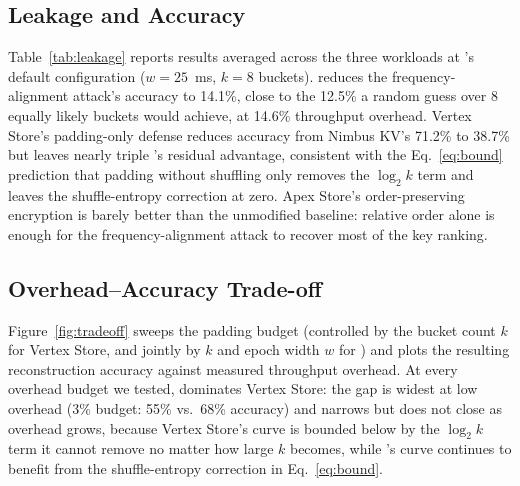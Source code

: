 \subsection{Leakage and Accuracy}
Table~\ref{tab:leakage} reports results averaged across the three
workloads at \sysname's default configuration ($w = 25$~ms, $k = 8$
buckets). \sysname{} reduces the frequency-alignment attack's accuracy to
14.1\%, close to the 12.5\% a random guess over 8 equally likely buckets
would achieve, at 14.6\% throughput overhead. Vertex Store's padding-only
defense reduces accuracy from Nimbus KV's 71.2\% to 38.7\% but leaves
nearly triple \sysname's residual advantage, consistent with the
Eq.~\ref{eq:bound} prediction that padding without shuffling only removes
the $\log_2 k$ term and leaves the shuffle-entropy correction at zero.
Apex Store's order-preserving encryption is barely better than the
unmodified baseline: relative order alone is enough for the
frequency-alignment attack to recover most of the key ranking.

\begin{table}[t]
  \centering
  \caption{Leakage and reconstruction accuracy averaged over three
    synthetic workloads. Lower is better in every leakage column.}
  \label{tab:leakage}
\end{table}

\subsection{Overhead--Accuracy Trade-off}
Figure~\ref{fig:tradeoff} sweeps the padding budget (controlled by the
bucket count $k$ for Vertex Store, and jointly by $k$ and epoch width $w$
for \sysname{}) and plots the resulting reconstruction accuracy against
measured throughput overhead. At every overhead budget we tested,
\sysname{} dominates Vertex Store: the gap is widest at low overhead
(3\% budget: 55\% vs.\ 68\% accuracy) and narrows but does not close as
overhead grows, because Vertex Store's curve is bounded below by the
$\log_2 k$ term it cannot remove no matter how large $k$ becomes, while
\sysname's curve continues to benefit from the shuffle-entropy correction
in Eq.~\ref{eq:bound}.

